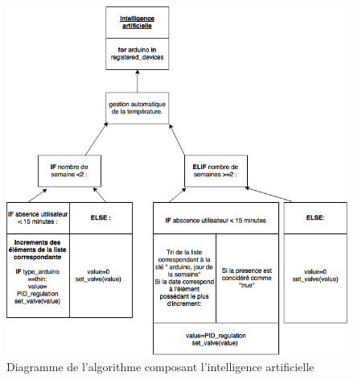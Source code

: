 \documentclass[12pt]{report}
\begin{document}
\begin{figure}[h]
\centering
\includegraphics[scale = 0.7]{diagramme_thermo.png}
\caption{\label{thermo} Diagramme de l'algorithme composant l'intelligence artificielle}
\end{figure}

\end{document}
